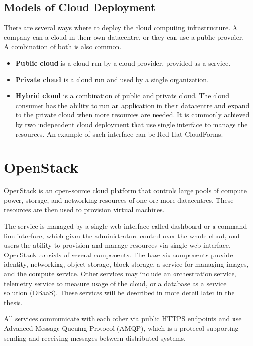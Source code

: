 \subsection{Models of Cloud Deployment}
There are several ways \cite{CL210} where to deploy the cloud computing infrastructure. A company can a cloud in their own datacentre, or they can use a public provider. A combination of both is also common.
\begin{itemize}
  \item{\textbf{Public cloud} is a cloud run by a cloud provider, provided as a service.}
  \item{\textbf{Private cloud} is a cloud run and used by a single organization.}
  \item{\textbf{Hybrid cloud} is a combination of public and private cloud. The cloud consumer has the ability to run an application in their datacentre and expand to the private cloud when more resources are needed. It is commonly achieved by two independent cloud deployment that use single interface to manage the resources. An example of such interface can be Red Hat CloudForms.}
\end{itemize}


\section{OpenStack}
\label{se:openstack-intro}
OpenStack is an open-source cloud platform that controls large pools of compute power, storage, and networking resources of one ore more datacentres. These resources are then used to provision virtual machines.

The service is managed by a single web interface called dashboard or a command-line interface, which gives the administrators control over the whole cloud, and users the ability to provision and manage resources via single web interface.
OpenStack consists of several components. The base six components provide identity, networking, object storage, block storage, a service for managing images, and the compute service. Other services may include an orchestration service, telemetry service to measure usage of the cloud, or a database as a service solution (DBaaS). These services will be described in more detail later in the thesis.

All services communicate with each other via public HTTPS endpoints and use Advanced Message Queuing Protocol (AMQP), which is a protocol supporting sending and receiving messages between distributed systems. \cite{CL210}


